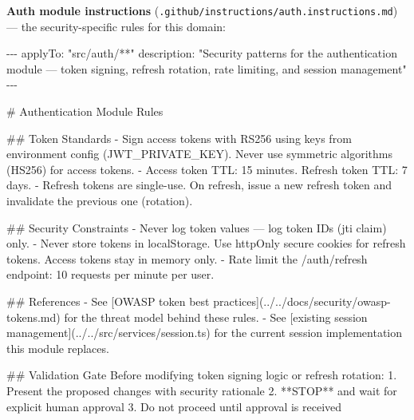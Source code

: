 \documentclass[
  a4paper,
  DIV=11,
  numbers=noendperiod]{scrreprt}
\newenvironment{Shaded}{\begin{snugshade}}{\end{snugshade}}
\newcommand{\AnnotationTok}[1]{\textcolor[rgb]{0.37,0.37,0.37}{#1}}
\newcommand{\CommentTok}[1]{\textcolor[rgb]{0.37,0.37,0.37}{#1}}
\newcommand{\FunctionTok}[1]{\textcolor[rgb]{0.28,0.35,0.67}{#1}}
\newcommand{\InformationTok}[1]{\textcolor[rgb]{0.37,0.37,0.37}{#1}}
\newcommand{\NormalTok}[1]{\textcolor[rgb]{0.00,0.23,0.31}{#1}}
\newcommand{\OtherTok}[1]{\textcolor[rgb]{0.00,0.23,0.31}{#1}}
\newcommand{\SpecialStringTok}[1]{\textcolor[rgb]{0.13,0.47,0.30}{#1}}
\begin{document}
\textbf{Auth module instructions}
(\texttt{.github/instructions/auth.instructions.md}) --- the
security-specific rules for this domain:

\begin{Shaded}
\begin{Highlighting}[]
\CommentTok{{-}{-}{-}}
\AnnotationTok{applyTo:}\CommentTok{ "src/auth/**"}
\AnnotationTok{description:}\CommentTok{ "Security patterns for the authentication module — token signing,}
\CommentTok{  refresh rotation, rate limiting, and session management"}
\CommentTok{{-}{-}{-}}

\FunctionTok{\# Authentication Module Rules}

\FunctionTok{\#\# Token Standards}
\SpecialStringTok{{-} }\NormalTok{Sign access tokens with RS256 using keys from environment config (}\InformationTok{\textasciigrave{}JWT\_PRIVATE\_KEY\textasciigrave{}}\NormalTok{).}
\NormalTok{  Never use symmetric algorithms (HS256) for access tokens.}
\SpecialStringTok{{-} }\NormalTok{Access token TTL: 15 minutes. Refresh token TTL: 7 days.}
\SpecialStringTok{{-} }\NormalTok{Refresh tokens are single{-}use. On refresh, issue a new refresh token and}
\NormalTok{  invalidate the previous one (rotation).}

\FunctionTok{\#\# Security Constraints}
\SpecialStringTok{{-} }\NormalTok{Never log token values — log token IDs (}\InformationTok{\textasciigrave{}jti\textasciigrave{}}\NormalTok{ claim) only.}
\SpecialStringTok{{-} }\NormalTok{Never store tokens in localStorage. Use httpOnly secure cookies for refresh}
\NormalTok{  tokens. Access tokens stay in memory only.}
\SpecialStringTok{{-} }\NormalTok{Rate limit the }\InformationTok{\textasciigrave{}/auth/refresh\textasciigrave{}}\NormalTok{ endpoint: 10 requests per minute per user.}

\FunctionTok{\#\# References}
\SpecialStringTok{{-} }\NormalTok{See }\CommentTok{[}\OtherTok{OWASP token best practices}\CommentTok{](../../docs/security/owasp{-}tokens.md)}\NormalTok{ for}
\NormalTok{  the threat model behind these rules.}
\SpecialStringTok{{-} }\NormalTok{See }\CommentTok{[}\OtherTok{existing session management}\CommentTok{](../../src/services/session.ts)}\NormalTok{ for the}
\NormalTok{  current session implementation this module replaces.}

\FunctionTok{\#\# Validation Gate}
\NormalTok{Before modifying token signing logic or refresh rotation:}
\SpecialStringTok{1. }\NormalTok{Present the proposed changes with security rationale}
\SpecialStringTok{2. }\NormalTok{**STOP** and wait for explicit human approval}
\SpecialStringTok{3. }\NormalTok{Do not proceed until approval is received}
\end{Highlighting}
\end{Shaded}
\end{document}
